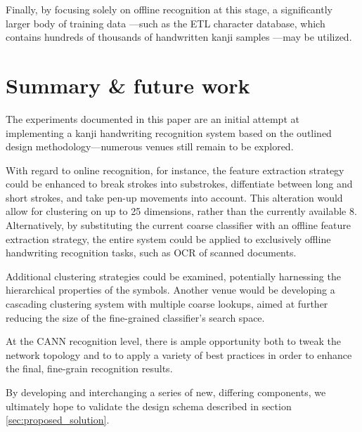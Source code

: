\documentclass[10pt,conference,a4paper]{IEEEtran}
\begin{document}
	Finally, by focusing solely on offline recognition at this stage, a significantly larger body of training data
	---such as the ETL character database, which contains hundreds of thousands of handwritten kanji samples \cite{yamamoto1986recognition}---may be utilized. 



	\section{Summary \& future work}
	\label{sec:future_work}

	The experiments documented in this paper are an initial \mbox{attempt} at implementing a kanji handwriting recognition \mbox{system}
	based on the outlined design methodology---numerous venues still remain to be explored.
	
	With regard to online recognition, for instance, the feature extraction strategy could be enhanced to break strokes into
	substrokes, diffentiate between long and short strokes, and take pen-up movements into account.
	This alteration would allow for clustering on up to 25 dimensions, rather than the currently available 8.
	Alternatively, by substituting the current coarse classifier with an offline feature extraction strategy, the entire system could
	be applied to exclusively offline handwriting recognition tasks, such as OCR of scanned documents.

	Additional clustering strategies could be examined, potentially harnessing the hierarchical properties of the symbols.
	Another venue would be developing a cascading clustering system with multiple coarse lookups, aimed at further
	reducing the size of the fine-grained classifier's search space.
	
	At the CANN recognition level, there is ample opportunity both to tweak the network topology and to 
	to apply a variety of best practices \cite{simard2003best} in order to enhance the final, fine-grain recognition results.

	By developing and interchanging a series of new, differing components, we ultimately hope to validate the design schema described in section \ref{sec:proposed_solution}. 




	
\end{document}
